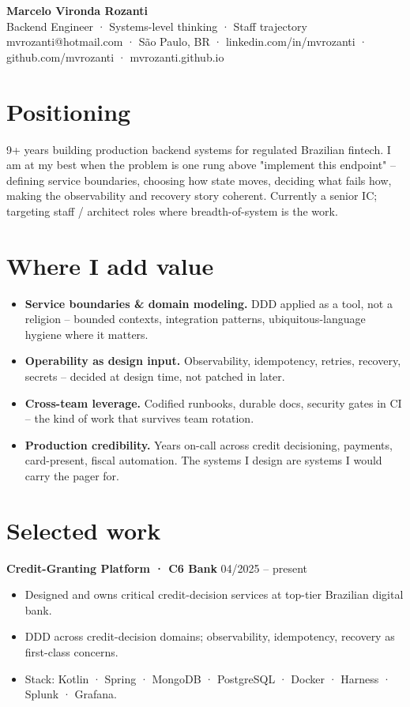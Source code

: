 \documentclass[10pt,a4paper]{article}
\begin{document}
\begin{center}
{\Huge\bfseries Marcelo Vironda Rozanti}\\[2pt]
{\large\color{accent} Backend Engineer · Systems-level thinking · Staff trajectory}\\[3pt]
{\small mvrozanti@hotmail.com · São Paulo, BR · linkedin.com/in/mvrozanti · github.com/mvrozanti · mvrozanti.github.io}
\end{center}

\section{Positioning}
9+ years building production backend systems for regulated Brazilian fintech. I am at my best when the problem is one rung above "implement this endpoint" -- defining service boundaries, choosing how state moves, deciding what fails how, making the observability and recovery story coherent. Currently a senior IC; targeting staff / architect roles where breadth-of-system is the work.

\section{Where I add value}
\begin{itemize}
\item \textbf{Service boundaries \& domain modeling.} DDD applied as a tool, not a religion -- bounded contexts, integration patterns, ubiquitous-language hygiene where it matters.
\item \textbf{Operability as design input.} Observability, idempotency, retries, recovery, secrets -- decided at design time, not patched in later.
\item \textbf{Cross-team leverage.} Codified runbooks, durable docs, security gates in CI -- the kind of work that survives team rotation.
\item \textbf{Production credibility.} Years on-call across credit decisioning, payments, card-present, fiscal automation. The systems I design are systems I would carry the pager for.
\end{itemize}

\section{Selected work}

\noindent\textbf{Credit-Granting Platform · C6 Bank} \hfill 04/2025 -- present
\begin{itemize}
\item Designed and owns critical credit-decision services at top-tier Brazilian digital bank.
\item DDD across credit-decision domains; observability, idempotency, recovery as first-class concerns.
\item Stack: Kotlin · Spring · MongoDB · PostgreSQL · Docker · Harness · Splunk · Grafana.
\end{itemize}
\end{document}
